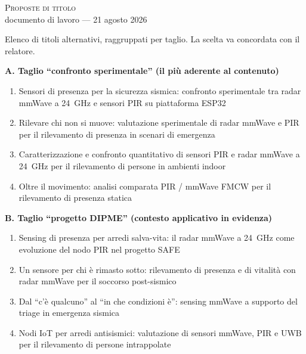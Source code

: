 \thispagestyle{empty}

\begin{fullwidth}
\begin{center}
{\LARGE\scshape Proposte di titolo}\\[2pt]
{\small documento di lavoro --- 21 agosto 2026}
\end{center}

\vspace{0.5em}
\noindent
Elenco di titoli alternativi, raggruppati per taglio. La scelta va concordata con
il relatore.

\vspace{1em}
\noindent\textbf{A. Taglio ``confronto sperimentale'' (il pi\`u aderente al contenuto)}
\begin{enumerate}[label=A\arabic*.,leftmargin=2.2em,itemsep=3pt]
  \item Sensori di presenza per la sicurezza sismica: confronto sperimentale tra
        radar mmWave a 24~GHz e sensori PIR su piattaforma ESP32
  \item Rilevare chi non si muove: valutazione sperimentale di radar mmWave e PIR
        per il rilevamento di presenza in scenari di emergenza
  \item Caratterizzazione e confronto quantitativo di sensori PIR e radar mmWave a
        24~GHz per il rilevamento di persone in ambienti indoor
  \item Oltre il movimento: analisi comparata PIR / mmWave FMCW per il rilevamento
        di presenza statica
\end{enumerate}

\vspace{0.6em}
\noindent\textbf{B. Taglio ``progetto DIPME'' (contesto applicativo in evidenza)}
\begin{enumerate}[label=B\arabic*.,leftmargin=2.2em,itemsep=3pt]
  \item Sensing di presenza per arredi salva-vita: il radar mmWave a 24~GHz come
        evoluzione del nodo PIR nel progetto SAFE
  \item Un sensore per chi \`e rimasto sotto: rilevamento di presenza e di vitalit\`a
        con radar mmWave per il soccorso post-sismico
  \item Dal ``c'\`e qualcuno'' al ``in che condizioni \`e'': sensing mmWave a supporto
        del triage in emergenza sismica
  \item Nodi IoT per arredi antisismici: valutazione di sensori mmWave, PIR e UWB
        per il rilevamento di persone intrappolate
\end{enumerate}


\end{fullwidth}
